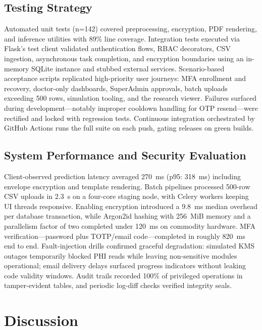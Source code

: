 \documentclass[conference]{IEEEtran}
\begin{document}
\subsection{Testing Strategy}
Automated unit tests (n=142) covered preprocessing, encryption, PDF rendering, and inference utilities with 89\% line coverage. Integration tests executed via Flask's test client validated authentication flows, RBAC decorators, CSV ingestion, asynchronous task completion, and encryption boundaries using an in-memory SQLite instance and stubbed external services. Scenario-based acceptance scripts replicated high-priority user journeys: MFA enrollment and recovery, doctor-only dashboards, SuperAdmin approvals, batch uploads exceeding 500 rows, simulation tooling, and the research viewer. Failures surfaced during development---notably improper cooldown handling for OTP resend---were rectified and locked with regression tests. Continuous integration orchestrated by GitHub Actions runs the full suite on each push, gating releases on green builds.

\subsection{System Performance and Security Evaluation}
Client-observed prediction latency averaged 270~ms (p95: 318~ms) including envelope encryption and template rendering. Batch pipelines processed 500-row CSV uploads in 2.3~s on a four-core staging node, with Celery workers keeping UI threads responsive. Enabling encryption introduced a 9.8~ms median overhead per database transaction, while Argon2id hashing with 256~MiB memory and a parallelism factor of two completed under 120~ms on commodity hardware. MFA verification---password plus TOTP/email code---completed in roughly 820~ms end to end. Fault-injection drills confirmed graceful degradation: simulated KMS outages temporarily blocked PHI reads while leaving non-sensitive modules operational; email delivery delays surfaced progress indicators without leaking code validity windows. Audit trails recorded 100\% of privileged operations in tamper-evident tables, and periodic log-diff checks verified integrity seals.

\section{Discussion}
\end{document}
